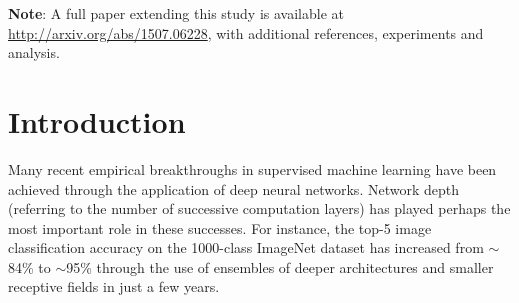 \documentclass{article}
\begin{document}

\begin{abstract}
There is plenty of theoretical and empirical evidence that depth of neural networks is a crucial ingredient for their success. However, network training becomes more difficult with increasing depth and training of very deep networks remains an open problem.
In this extended abstract, we introduce a new architecture designed to ease gradient-based training of very deep networks. 
We refer to networks with this architecture as highway networks, since they allow unimpeded information flow across several layers on \emph{information highways}. 
The architecture is characterized by the use of gating units which learn to regulate the flow of information through a network.
Highway networks with hundreds of layers can be trained directly using stochastic gradient descent and with a variety of activation functions, opening up the possibility of studying extremely deep and efficient architectures.

\end{abstract}

\textbf{Note}: A full paper extending this study is available at \url{http://arxiv.org/abs/1507.06228}, with additional references, experiments and analysis.

\section{Introduction}

Many recent empirical breakthroughs in supervised machine learning have been achieved through the application of deep neural networks. Network depth (referring to the number of successive computation layers) has played perhaps the most important role in these successes. For instance, the top-5 image classification accuracy on the 1000-class ImageNet dataset has increased from $\sim$84\% \citep{Krizhevsky2012} to $\sim$95\% \citep{Szegedy2014,Simonyan2014} through the use of ensembles of deeper architectures and smaller receptive fields \citep{Ciresan2011a,Ciresan2011,Ciresan2012} in just a few years. 
\end{document}
